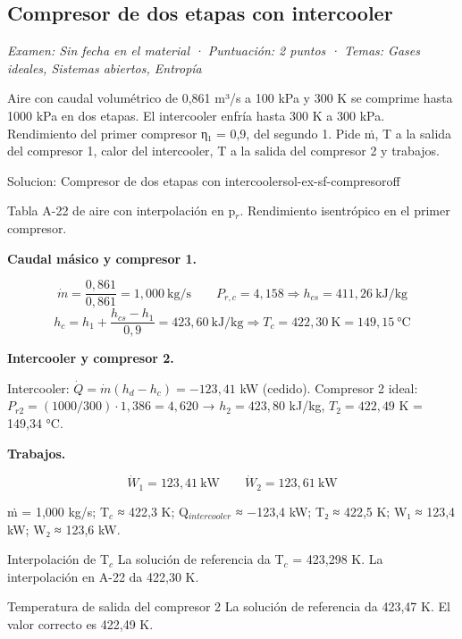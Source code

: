 \documentclass[11pt,a4paper]{article}
\begin{document}
\subsection{Compresor de dos etapas con intercooler}
\noindent\textit{Examen: Sin fecha en el material · Puntuación: 2 puntos · Temas: Gases ideales, Sistemas abiertos, Entropía}\par\medskip

Aire con caudal volumétrico de 0,861 m³/s a 100 kPa y 300 K se comprime hasta 1000 kPa en dos etapas. El intercooler enfría hasta 300 K a 300 kPa. Rendimiento del primer compresor η₁ = 0,9, del segundo 1. Pide ṁ, T a la salida del compresor 1, calor del intercooler, T a la salida del compresor 2 y trabajos.

\begin{ocg}{Solucion: Compresor de dos etapas con intercooler}{sol-ex-sf-compresor}{off}
\begin{antesbox}
Tabla A-22 de aire con interpolación en p$_{r}$. Rendimiento isentrópico en el primer compresor.
\end{antesbox}

\par\medskip\noindent\textbf{Caudal másico y compresor 1.}\par
\[\dot m = \frac{0{,}861}{0{,}861} = 1{,}000\ \text{kg/s} \qquad P_{r,c} = 4{,}158 \Rightarrow h_{cs} = 411{,}26\ \text{kJ/kg}\]   \[h_c = h_1 + \frac{h_{cs} - h_1}{0{,}9} = 423{,}60\ \text{kJ/kg} \Rightarrow T_c = 422{,}30\ \text{K} = 149{,}15\ \text{°C}\]

\par\medskip\noindent\textbf{Intercooler y compresor 2.}\par
Intercooler:  $\dot Q = \dot m(h_d - h_c) = -123{,}41$  kW (cedido). Compresor 2 ideal:  $P_{r2} = (1000/300)\cdot 1{,}386 = 4{,}620$  →  $h_2 = 423{,}80$  kJ/kg,  $T_2 = 422{,}49$  K = 149,34 °C.

\par\medskip\noindent\textbf{Trabajos.}\par
\[\dot W_1 = 123{,}41\ \text{kW} \qquad \dot W_2 = 123{,}61\ \text{kW}\]

\begin{resbox}
ṁ = 1,000 kg/s; T$_{c}$ ≈ 422,3 K; Q$_{intercooler}$ ≈ −123,4 kW; T₂ ≈ 422,5 K; W₁ ≈ 123,4 kW; W₂ ≈ 123,6 kW.
\end{resbox}

\begin{ojobox}{Interpolación de T$_{c}$}
La solución de referencia da T$_{c}$ = 423,298 K. La interpolación en A-22 da 422,30 K.
\end{ojobox}

\begin{ojobox}{Temperatura de salida del compresor 2}
La solución de referencia da 423,47 K. El valor correcto es 422,49 K.
\end{ojobox}

\hspace{0pt}\end{ocg}
\end{document}
